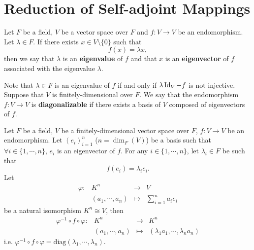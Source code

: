 \section{Reduction of Self-adjoint Mappings}

\begin{definitionenv}
    Let $F$ be a field, $V$ be a vector space over $F$ and $f:V\rightarrow V$ be an endomorphism.
    Let $\lambda\in F$.
    If there exists $x\in V\setminus\{0\}$ such that
    $$f(x) = \lambda x,$$
    then we say that $\lambda$ is an \textbf{eigenvalue} of $f$ and that $x$ is an \textbf{eigenvector} of $f$ associated with the eigenvalue $\lambda$.
    
    \quad Note that $\lambda \in F$ is an eigenvalue of $f$ if and only if $\lambda \operatorname{\mathrm{Id}}_{V} - f$ is not injective.
    Suppose that $V$ is finitely-dimensional over $F$. 
    We say that the endomorphism $f: V\rightarrow V$ is \textbf{diagonalizable} if there exists a basis of $V$ composed of eigenvectors of $f$.
\end{definitionenv}

\begin{remark}
    Let $F$ be a field, $V$ be a finitely-dimensional vector space over $F$, $f:V\rightarrow V$ be an endomorphism.
    Let $\left(e_i\right)_{i=1}^{n}$ ($n = \dim_F(V)$) be a basis such that $\forall i\in \{1,\cdots,n\}$, $e_i$ is an eigenvector of $f$.
    For any $i\in \{1,\cdots,n\}$, let $\lambda_i \in F$ be such that 
    $$ f(e_i) = \lambda_i e_i.$$
    Let
    $$\begin{array}{rrcl}
        \varphi: & K^n & \rightarrow & V\\
        & (a_1,\cdots,a_n) & \mapsto & \sum_{i=1}^{n} a_i e_i
    \end{array}$$
    be a natural isomorphism $K^n \cong V$, then 
    $$ \begin{array}{rrcl}
        \varphi^{-1} \circ f \circ \varphi: & K^n & \rightarrow & K^n\\
        & (a_1,\cdots,a_n) & \mapsto & (\lambda_1 a_1,\cdots,\lambda_n a_n)
    \end{array}$$
    i.e. $\varphi^{-1}\circ f \circ \varphi = \mathrm{diag} (\lambda_1,\cdots,\lambda_n)$.
\end{remark}

